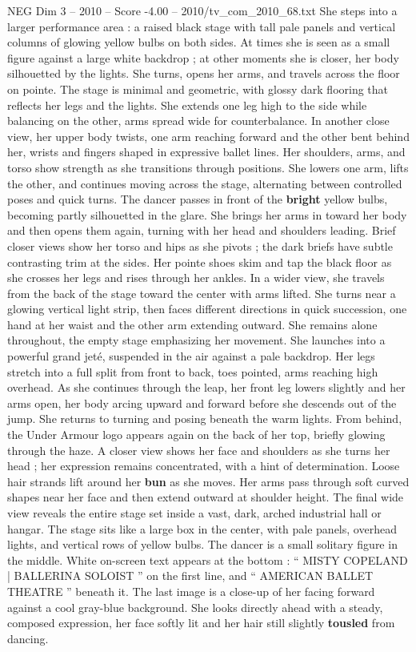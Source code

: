 \begin{textsample}{NEG Dim 3 – 2010 – Score -4.00 – 2010/tv\_com\_2010\_68.txt}
She steps into a larger performance area : a raised black stage with tall pale panels and vertical columns of glowing yellow bulbs on both sides.
At times she is seen as a small figure against a large white backdrop ; at other moments she is closer, her body silhouetted by the lights.
She turns, opens her arms, and travels across the floor on pointe.
The stage is minimal and geometric, with glossy dark flooring that reflects her legs and the lights.
She extends one leg high to the side while balancing on the other, arms spread wide for counterbalance.
In another close view, her upper body twists, one arm reaching forward and the other bent behind her, wrists and fingers shaped in expressive ballet lines.
Her shoulders, arms, and torso show strength as she transitions through positions.
She lowers one arm, lifts the other, and continues moving across the stage, alternating between controlled poses and quick turns.
The dancer passes in front of the \textbf{bright} yellow bulbs, becoming partly silhouetted in the glare.
She brings her arms in toward her body and then opens them again, turning with her head and shoulders leading.
Brief closer views show her torso and hips as she pivots ; the dark briefs have subtle contrasting trim at the sides.
Her pointe shoes skim and tap the black floor as she crosses her legs and rises through her ankles.
In a wider view, she travels from the back of the stage toward the center with arms lifted.
She turns near a glowing vertical light strip, then faces different directions in quick succession, one hand at her waist and the other arm extending outward.
She remains alone throughout, the empty stage emphasizing her movement.
She launches into a powerful grand jeté, suspended in the air against a pale backdrop.
Her legs stretch into a full split from front to back, toes pointed, arms reaching high overhead.
As she continues through the leap, her front leg lowers slightly and her arms open, her body arcing upward and forward before she descends out of the jump.
She returns to turning and posing beneath the warm lights.
From behind, the Under Armour logo appears again on the back of her top, briefly glowing through the haze.
A closer view shows her face and shoulders as she turns her head ; her expression remains concentrated, with a hint of determination.
Loose hair strands lift around her \textbf{bun} as she moves.
Her arms pass through soft curved shapes near her face and then extend outward at shoulder height.
The final wide view reveals the entire stage set inside a vast, dark, arched industrial hall or hangar.
The stage sits like a large box in the center, with pale panels, overhead lights, and vertical rows of yellow bulbs.
The dancer is a small solitary figure in the middle.
White on-screen text appears at the bottom : “ MISTY COPELAND | BALLERINA SOLOIST ” on the first line, and “ AMERICAN BALLET THEATRE ” beneath it.
The last image is a close-up of her facing forward against a cool gray-blue background.
She looks directly ahead with a steady, composed expression, her face softly lit and her hair still slightly \textbf{tousled} from dancing.

\end{textsample}
